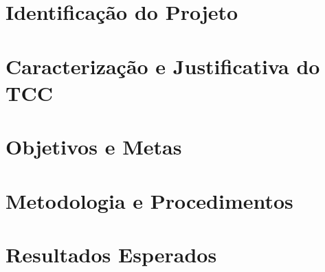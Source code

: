 \documentclass[capchap,sumarioincompleto,a4paper,12pt,ruledheader,normaltoc]{./sty/utfprtex}%
\begin{document}

\capa%

\ABNTBeginOfTextualPart

\chapter{Identificação do Projeto}
\FichaDeDados

\chapter{Caracterização e Justificativa do TCC}
\label{cap:caracterizacao} 


\chapter{Objetivos e Metas}
\label{cap:objetivos}


\chapter{Metodologia e Procedimentos}
\label{cap:metodologia}


\chapter{Resultados Esperados}
\label{cap:resultados}








\end{document}
